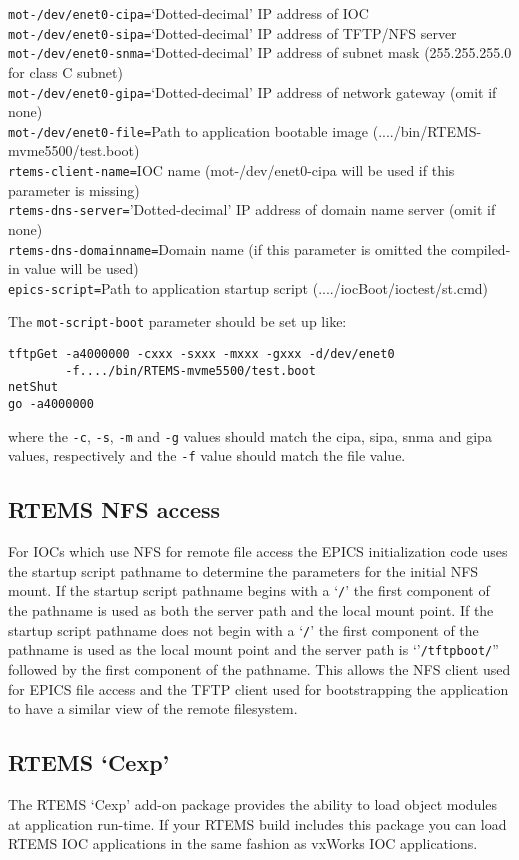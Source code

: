 \noindent
\verb|mot-/dev/enet0-cipa=|`Dotted-decimal' IP address of IOC\\
\verb|mot-/dev/enet0-sipa=|`Dotted-decimal' IP address of TFTP/NFS server\\
\verb|mot-/dev/enet0-snma=|`Dotted-decimal' IP address of subnet mask (255.255.255.0 for class C subnet)\\
\verb|mot-/dev/enet0-gipa=|`Dotted-decimal' IP address of network gateway (omit if none)\\
\verb|mot-/dev/enet0-file=|Path to application bootable image (..../bin/RTEMS-mvme5500/test.boot)\\
\verb|rtems-client-name=|IOC name (mot-/dev/enet0-cipa will be used if this parameter is missing)\\
\verb|rtems-dns-server=|'Dotted-decimal' IP address of domain name server (omit if none)\\
\verb|rtems-dns-domainname=|Domain name (if this parameter is omitted the compiled-in value will be used)\\
\verb|epics-script=|Path to application startup script (..../iocBoot/ioctest/st.cmd)

The \verb|mot-script-boot| parameter should be set up like:

\begin{verbatim}
tftpGet -a4000000 -cxxx -sxxx -mxxx -gxxx -d/dev/enet0
        -f..../bin/RTEMS-mvme5500/test.boot
netShut
go -a4000000
\end{verbatim}

where the \verb|-c|, \verb|-s|, \verb|-m| and \verb|-g| values should match the cipa, sipa, snma and gipa values, 
respectively and the \verb|-f| value should match the file value.

\subsection{RTEMS NFS access}

For IOCs which use NFS for remote file access the EPICS initialization code uses the startup script pathname to 
determine the parameters for the initial NFS mount.  If the startup script pathname begins with a `\verb|/|' the first component 
of the pathname is used as both the server path and the local mount point. If the startup script pathname does not begin 
with a `\verb|/|' the first component of the pathname is used as the local mount point and the server path is `'\verb|/tftpboot/|'' 
followed by the first component of the pathname.  This allows the NFS client used for EPICS file access and the TFTP 
client used for bootstrapping the application to have a similar view of the remote filesystem.

\subsection{RTEMS `Cexp'}

The RTEMS `Cexp' add-on package provides the ability to load object modules at application run-time.  If your RTEMS 
build includes this package you can load RTEMS IOC applications in the same fashion as vxWorks IOC applications.

